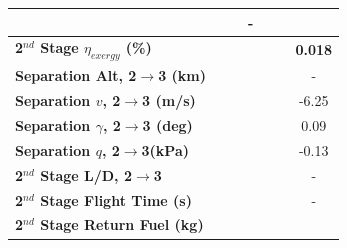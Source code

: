 \begin{table}[ht]
\begin{tabular}{l c c c c c c}
		& \firstsecondSeparationgammamThreeOneHundredFive
		& \firstsecondSeparationgammamThreeOneHundredTen
		& -
		\\
		\hline 
		\textbf{2$^{nd}$ Stage $\eta_{exergy}$ (\%)}
		& \textbf{\secondExergyEffmThreeNinety}
		& \textbf{\secondExergyEffmThreeNinetyFive}
		& \textbf{\secondExergyEffmThreeStandard}
		& \textbf{\secondExergyEffmThreeOneHundredFive}
		& \textbf{\secondExergyEffmThreeOneHundredTen}
		& \textbf{0.018}
		\\
		\textbf{Separation Alt, 2$\rightarrow$3 (km)}
		& \secondthirdSeparationAltmThreeNinety
		& \secondthirdSeparationAltmThreeNinetyFive
		& \secondthirdSeparationAltmThreeStandard
		& \secondthirdSeparationAltmThreeOneHundredFive
		& \secondthirdSeparationAltmThreeOneHundredTen
		& -
		\\
		\textbf{Separation $v$, 2$\rightarrow$3 (m/s)}
		& \secondthirdSeparationvmThreeNinety
		& \secondthirdSeparationvmThreeNinetyFive
		& \secondthirdSeparationvmThreeStandard
		& \secondthirdSeparationvmThreeOneHundredFive
		& \secondthirdSeparationvmThreeOneHundredTen
		&-6.25
		\\
		\textbf{Separation $\gamma$, 2$\rightarrow$3 (deg)}
		& \secondthirdSeparationgammamThreeNinety
		& \secondthirdSeparationgammamThreeNinetyFive
		& \secondthirdSeparationgammamThreeStandard
		& \secondthirdSeparationgammamThreeOneHundredFive
		& \secondthirdSeparationgammamThreeOneHundredTen
		&0.09
		\\
		\textbf{Separation $q$, 2$\rightarrow$3(kPa)}
		& \secondthirdSeparationqmThreeNinety
		& \secondthirdSeparationqmThreeNinetyFive
		& \secondthirdSeparationqmThreeStandard
		& \secondthirdSeparationqmThreeOneHundredFive
		& \secondthirdSeparationqmThreeOneHundredTen
		&-0.13
		\\
		\textbf{2$^{nd}$ Stage L/D, 2$\rightarrow$3}
		& \secondthirdSeparationLDmThreeNinety
		& \secondthirdSeparationLDmThreeNinetyFive
		& \secondthirdSeparationLDmThreeStandard
		& \secondthirdSeparationLDmThreeOneHundredFive
		& \secondthirdSeparationLDmThreeOneHundredTen
		& -
		\\
		\textbf{2$^{nd}$ Stage Flight Time (s)}
		& \secondFlightTimemThreeNinety
		& \secondFlightTimemThreeNinetyFive
		& \secondFlightTimemThreeStandard
		& \secondFlightTimemThreeOneHundredFive
		& \secondFlightTimemThreeOneHundredTen
		& -
		\\
		\textbf{2$^{nd}$ Stage Return Fuel (kg)}
		& \returnFuelmThreeNinety
		& \returnFuelmThreeNinetyFive
		& \returnFuelmThreeStandard
		& \returnFuelmThreeOneHundredFive

\end{tabular}
\end{table}
